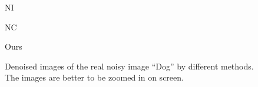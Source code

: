 \begin{figure}
{\begin{minipage}[t]{0.19\textwidth}
{\footnotesize NI}
\end{minipage}
\begin{minipage}[t]{0.19\textwidth}
\centering
{}
{\footnotesize NC}
\end{minipage}
\begin{minipage}[t]{0.19\textwidth}
\centering
{}
{\footnotesize Ours}
\end{minipage}
}
\caption{Denoised images of the real noisy image ``Dog'' \cite{ncwebsite} by different methods. The images are better to be zoomed in on screen.}
    \label{fig3-9}
\end{figure}

